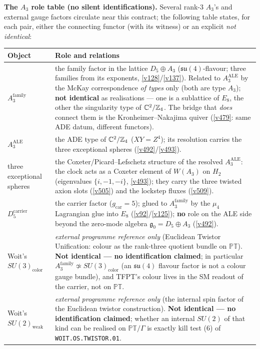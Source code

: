 \par\smallskip\noindent\textbf{The $A_3$ role table (no silent identifications).} Several rank-$3$
$A_3$'s and external gauge factors circulate near this contract; the following table states, for
each pair, either the connecting functor (with its witness) or an explicit \emph{not identical}:
\begin{center}\footnotesize
\renewcommand{\arraystretch}{1.22}
\begin{tabularx}{\linewidth}{@{}lY@{}}
\toprule
\textbf{Object} & \textbf{Role and relations} \\
\midrule
$A_3^{\mathrm{family}}$ & the family factor in the lattice $D_5{\oplus}A_3$
($\mathfrak{su}(4)$-flavour; three families from its exponents, \vref{v128}/\vref{v137}). Related
to $A_3^{\mathrm{ALE}}$ by the McKay correspondence \emph{of types} only (both are type $A_3$);
\textbf{not identical} as realisations --- one is a sublattice of $E_8$, the other the singularity
type of $\mathbb C^2/\mathbb Z_4$. The bridge that \emph{does} connect them is the Kronheimer--Nakajima
quiver (\vref{v479}: same ADE datum, different functors). \\
$A_3^{\mathrm{ALE}}$ & the ADE type of $\mathbb C^2/\mathbb Z_4$ ($XY=Z^4$); its resolution carries the
three exceptional spheres (\vref{v492}/\vref{v493}). \\
three exceptional spheres & the Coxeter/Picard--Lefschetz structure of the resolved $A_3^{\mathrm{ALE}}$:
the clock acts as a Coxeter element of $W(A_3)$ on $H_2$ (eigenvalues $\{i,-1,-i\}$, \vref{v493});
they carry the three twisted axion slots (\vref{v505}) and the lockstep fluxes (\vref{v509}). \\
$D_5^{\mathrm{carrier}}$ & the carrier factor ($g_{\mathrm{car}}=5$); glued to $A_3^{\mathrm{family}}$
by the $\mu_4$ Lagrangian glue into $E_8$ (\vref{v92}/\vref{v125}); \textbf{no} role on the ALE side
beyond the zero-mode algebra $\mathfrak g_0=D_5{\oplus}A_3$ (\vref{v492}). \\
Woit's $SU(3)_{\mathrm{color}}$ & \emph{external programme reference only} (Euclidean Twistor
Unification: colour as the rank-three quotient bundle on $\mathbb{PT}$).
\textbf{Not identical --- no identification claimed}; in particular
$A_3^{\mathrm{family}}\not\simeq SU(3)_{\mathrm{color}}$ (an $\mathfrak{su}(4)$ flavour factor is
not a colour gauge bundle), and TFPT's colour lives in the SM readout of the carrier, not on
$\mathbb{PT}$. \\
Woit's $SU(2)_{\mathrm{weak}}$ & \emph{external programme reference only} (the internal spin factor
of the Euclidean twistor construction). \textbf{Not identical --- no identification claimed}; whether
an internal $SU(2)$ of that kind can be realised on $\mathbb{PT}/\Gamma$ is exactly kill test (6)
of \texttt{WOIT.OS.TWISTOR.01}. \\
\bottomrule
\end{tabularx}
\end{center}

